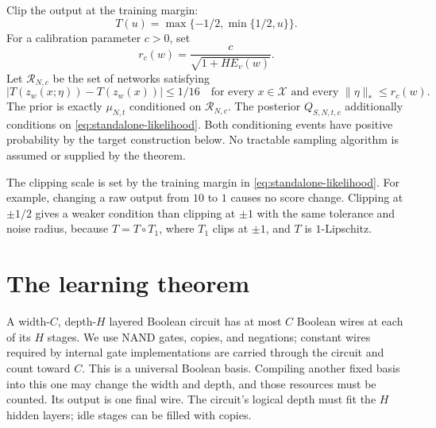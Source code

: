 Clip the output at the training margin:
\[
 T(u)=\max\{-1/2,\min\{1/2,u\}\}.
\]
For a calibration parameter $c>0$, set
\begin{equation}\label{eq:standalone-radius}
 r_c(w)=\frac{c}{\sqrt{1+H E_v(w)}}.
\end{equation}
Let $\mathcal R_{N,c}$ be the set of networks satisfying
\begin{equation}\label{eq:standalone-support}
 |T(z_w(x;\eta))-T(z_w(x))|\le1/16
 \quad\text{for every }x\in\mathcal X
 \text{ and every }\|\eta\|_*\le r_c(w).
\end{equation}
The prior is exactly $\mu_{N,t}$ conditioned on $\mathcal R_{N,c}$.
The posterior $Q_{S,N,t,c}$ additionally conditions on
\eqref{eq:standalone-likelihood}. Both conditioning events have positive
probability by the target construction below. No tractable sampling
algorithm is assumed or supplied by the theorem.

The clipping scale is set by the training margin in
\eqref{eq:standalone-likelihood}. For
example, changing a raw output from $10$ to $1$ causes no score change.
Clipping at $\pm1/2$ gives a weaker condition than clipping at $\pm1$ with
the same tolerance and noise radius, because
$T=T\circ T_1$, where $T_1$ clips at $\pm1$, and $T$ is $1$-Lipschitz.

\section{The learning theorem}
\label{sec:theory-main}

A width-$C$, depth-$H$ layered Boolean circuit has at most $C$ Boolean wires
at each of its $H$ stages. We use NAND gates, copies, and negations;
constant wires required by internal gate implementations are carried
through the circuit and count toward $C$. This is a universal Boolean
basis. Compiling another fixed basis into this one may change the width
and depth, and those resources must be counted. Its output is one final wire.
The circuit's logical depth must fit the $H$ hidden layers; idle stages
can be filled with copies.

